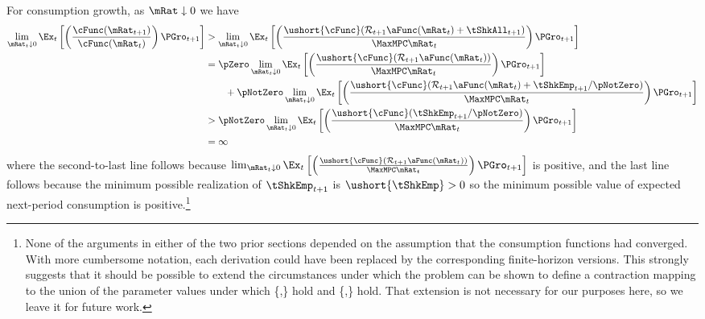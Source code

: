 \documentclass[BufferStockTheory]{subfiles}
\begin{document}
For consumption growth, as $\mRat \downarrow 0$ we have
\begin{align*}
  \lim_{\mRat_{t} \downarrow 0} \Ex_{t}\left[\left(\frac{\cFunc({\mRat}_{t+1})}{\cFunc(\mRat_t)}\right){\PGro}_{t+1}\right]
  & > \lim_{\mRat_{t} \downarrow 0} \Ex_{t}\left[\left(\frac{\ushort{\cFunc}({\mathcal{\mathcal{R}}}_{t+1}\aFunc(\mRat_{t})+{%
    \tShkAll}_{t+1})}{\MaxMPC \mRat_{t}}\right){\PGro}_{t+1}\right]  \notag \\
  & = \pZero \lim_{\mRat_{t} \downarrow 0} \Ex_{t}\left[\left(\frac{\ushort{\cFunc}({\mathcal{\mathcal{R}}}_{t+1}\aFunc(\mRat_{t}))}{\MaxMPC \mRat_{t}}\right){\PGro}_{t+1}\right] \\
  & ~~~~~~ + \pNotZero \lim_{\mRat_{t} \downarrow 0}  \Ex_{t}\left[\left(\frac{\ushort{\cFunc}({\mathcal{\mathcal{R}}}_{t+1}\aFunc(\mRat_{t})+
    \tShkEmp_{t+1}/\pNotZero)}{\MaxMPC \mRat_{t}}\right){\PGro}_{t+1}\right]  \\\notag
  & > \pNotZero \lim_{\mRat_{t} \downarrow 0} \Ex_{t}\left[\left(\frac{\ushort{\cFunc}(
    \tShkEmp_{t+1}/\pNotZero)}{\MaxMPC \mRat_{t}}\right){\PGro}_{t+1}\right] \\
  & = \infty \nonumber
\end{align*}
where the second-to-last line follows because  $\lim_{\mRat_{t} \downarrow 0} \Ex_{t}\left[\left(\frac{\ushort{\cFunc}({\mathcal{\mathcal{R}}}_{t+1}\aFunc(\mRat_{t}))}{\MaxMPC \mRat_{t}}\right){\PGro}_{t+1}\right]$ is positive, and the last line follows because the minimum possible realization of $\tShkEmp_{t+1}$ is $\ushort{\tShkEmp}>0$ so the minimum possible value of expected next-period consumption is positive.\footnote{None of the arguments in either of the two prior sections depended on the assumption that the consumption functions had converged.  With more cumbersome notation, each derivation could have been replaced by the corresponding finite-horizon versions.  This strongly suggests that it should be possible to extend the circumstances under which the problem can be shown to define a contraction mapping to the union of the parameter values under which \{\RIC,\FHWC\} hold and \{\FVAC,\WRIC\} hold.  That extension is not necessary for our purposes here, so we leave it for future work.}



\hypertarget{onetarget}{}
\hypertarget{Unique-Stable-Points}{}
\end{document}
